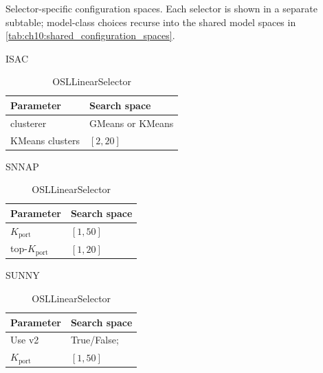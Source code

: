 \begin{table}[!htbp]
\caption[Selector-specific configuration spaces]{Selector-specific configuration spaces. Each selector is shown in a separate subtable; model-class choices recurse into the shared model spaces in \cref{tab:ch10:shared_configuration_spaces}.}
\label{tab:ch10:selector_configuration_spaces}

  \centering


  \begin{subtable}[t]{0.48\textwidth}
    \centering
    \caption{ISAC}
    \begin{tabularx}{\linewidth}{@{}>{\RaggedRight\arraybackslash}X>{\RaggedRight\arraybackslash}p{.40\linewidth}@{}}
      \toprule
      Parameter & Search space \\
      \midrule
      clusterer & GMeans or KMeans \\
      KMeans clusters & $[2,20]$ \\
      \bottomrule
    \end{tabularx}\end{subtable}\hfill
\begin{subtable}[t]{0.48\textwidth}
    \centering
    \caption{SNNAP}
    \begin{tabularx}{\linewidth}{@{}>{\RaggedRight\arraybackslash}X>{\RaggedRight\arraybackslash}p{.40\linewidth}@{}}
      \toprule
      Parameter & Search space \\
      \midrule
      $K_{\mathrm{port}}$ & $[1,50]$ \\
      top-$K_{\mathrm{port}}$ & $[1,20]$\\
      \bottomrule
    \end{tabularx}\end{subtable}
\par\medskip
\begin{subtable}[t]{0.48\textwidth}
    \centering
    \caption{SUNNY}
    \begin{tabularx}{\linewidth}{@{}>{\RaggedRight\arraybackslash}X>{\RaggedRight\arraybackslash}p{.40\linewidth}@{}}
      \toprule
      Parameter & Search space \\
      \midrule
      Use v2 & True/False; \\
      $K_{\mathrm{port}}$ & $[1,50]$ \\
      \bottomrule
    \end{tabularx}\end{subtable}\hfill
\begin{subtable}[t]{0.48\textwidth}
    \centering
    \caption{OSLLinearSelector}

\end{subtable}
\end{table}
